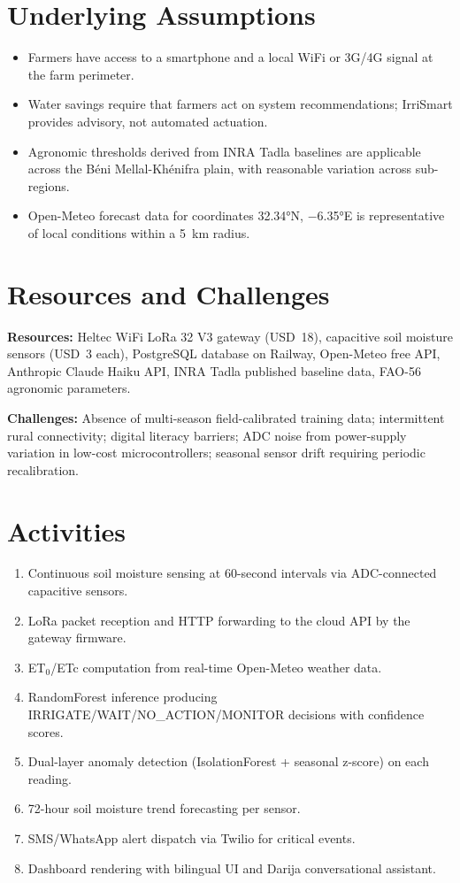\documentclass[12pt,a4paper]{report}
\begin{document}
\section{Underlying Assumptions}
\begin{itemize}
  \item Farmers have access to a smartphone and a local WiFi or 3G/4G signal at the farm perimeter.
  \item Water savings require that farmers act on system recommendations; IrriSmart provides advisory, not automated actuation.
  \item Agronomic thresholds derived from INRA Tadla baselines are applicable across the Béni Mellal-Khénifra plain, with reasonable variation across sub-regions.
  \item Open-Meteo forecast data for coordinates 32.34°N, $-$6.35°E is representative of local conditions within a 5~km radius.
\end{itemize}

\section{Resources and Challenges}

\textbf{Resources:} Heltec WiFi LoRa 32 V3 gateway (USD~18), capacitive soil moisture sensors (USD~3 each), PostgreSQL database on Railway, Open-Meteo free API, Anthropic Claude Haiku API, INRA Tadla published baseline data, FAO-56 agronomic parameters.

\textbf{Challenges:} Absence of multi-season field-calibrated training data; intermittent rural connectivity; digital literacy barriers; ADC noise from power-supply variation in low-cost microcontrollers; seasonal sensor drift requiring periodic recalibration.

\section{Activities}
\begin{enumerate}
  \item Continuous soil moisture sensing at 60-second intervals via ADC-connected capacitive sensors.
  \item LoRa packet reception and HTTP forwarding to the cloud API by the gateway firmware.
  \item ET$_0$/ETc computation from real-time Open-Meteo weather data.
  \item RandomForest inference producing IRRIGATE/WAIT/NO\_ACTION/MONITOR decisions with confidence scores.
  \item Dual-layer anomaly detection (IsolationForest + seasonal z-score) on each reading.
  \item 72-hour soil moisture trend forecasting per sensor.
  \item SMS/WhatsApp alert dispatch via Twilio for critical events.
  \item Dashboard rendering with bilingual UI and Darija conversational assistant.
\end{enumerate}
\end{document}
